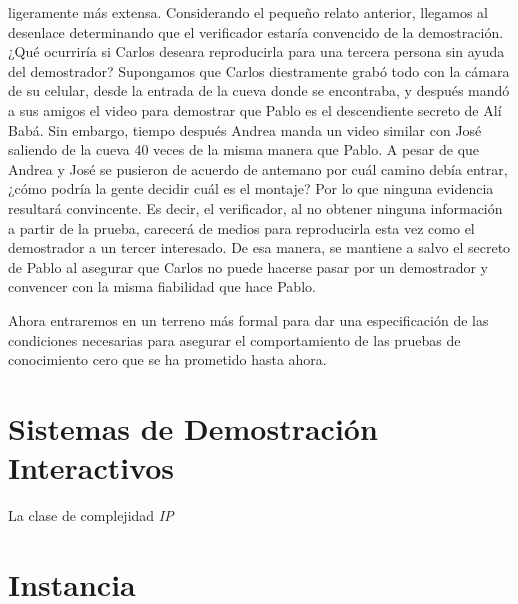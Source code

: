 \documentclass[oneside,10pt]{article}
\begin{document}
\begin{itemize}
  ligeramente más extensa. Considerando el pequeño relato anterior, llegamos al desenlace
  determinando que el verificador estaría convencido de la demostración. ¿Qué ocurriría si Carlos
  deseara reproducirla para una tercera persona sin ayuda del demostrador? Supongamos que Carlos
  diestramente
  grabó todo con la cámara de su celular, desde la entrada de la cueva donde se encontraba, y después
  mandó a sus amigos el video para demostrar que Pablo es el descendiente secreto de Alí Babá. Sin
  embargo, tiempo después Andrea manda un video similar con José saliendo de la cueva 40 veces de la
  misma manera que Pablo. A pesar de que Andrea y José se pusieron de acuerdo de antemano por cuál
  camino debía entrar, ¿cómo podría la gente decidir cuál es el montaje? Por lo que ninguna evidencia resultará convincente. Es decir, el verificador,
  al no obtener ninguna información a partir de la prueba, carecerá de medios para reproducirla esta vez
  como el demostrador a un tercer interesado. De esa manera, se mantiene a salvo el secreto de Pablo al asegurar que Carlos
  no puede hacerse pasar por un demostrador y convencer con la misma fiabilidad que hace Pablo.
\end{itemize}

Ahora entraremos en un terreno más formal para dar una especificación de las condiciones necesarias
para asegurar el comportamiento de las pruebas de conocimiento cero que se ha prometido hasta ahora.

\section{Sistemas de Demostración Interactivos}
La clase de complejidad \emph{IP} \cite{arora}


\section{Instancia}
\end{document}
